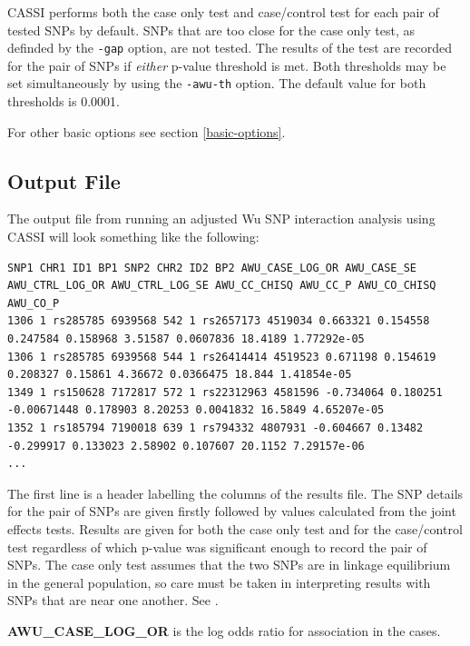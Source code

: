 \documentclass[a4paper,12pt]{article}
\newcommand{\code}[1]{{\footnotesize{{\tt #1}}}}
\begin{document}
CASSI performs both the case only test and case/control test for each pair of tested SNPs by default. SNPs that are too close for the case only test, as definded by the \code{-gap} option, are not tested. The results of the test are recorded for the pair of SNPs if {\it either} p-value threshold is met. Both thresholds may be set simultaneously by using the \code{-awu-th} option. The default value for both thresholds is 0.0001. 

For other basic options see  section \ref{basic-options}. 


\subsection{Output File}
\label{awu-output}

The output file from running an adjusted Wu SNP interaction analysis using CASSI will look something like the following: 
\vspace{0.35cm} \begin{lstlisting}
SNP1 CHR1 ID1 BP1 SNP2 CHR2 ID2 BP2 AWU_CASE_LOG_OR AWU_CASE_SE AWU_CTRL_LOG_OR AWU_CTRL_LOG_SE AWU_CC_CHISQ AWU_CC_P AWU_CO_CHISQ AWU_CO_P
1306 1 rs285785 6939568 542 1 rs2657173 4519034 0.663321 0.154558 0.247584 0.158968 3.51587 0.0607836 18.4189 1.77292e-05
1306 1 rs285785 6939568 544 1 rs26414414 4519523 0.671198 0.154619 0.208327 0.15861 4.36672 0.0366475 18.844 1.41854e-05
1349 1 rs150628 7172817 572 1 rs22312963 4581596 -0.734064 0.180251 -0.00671448 0.178903 8.20253 0.0041832 16.5849 4.65207e-05
1352 1 rs185794 7190018 639 1 rs794332 4807931 -0.604667 0.13482 -0.299917 0.133023 2.58902 0.107607 20.1152 7.29157e-06
...

\end{lstlisting} \vspace{0.35cm}
The first line is a header labelling the columns of the results file. The SNP details for the pair of SNPs are given firstly followed by values calculated from the joint effects tests. Results are given for both the case only test and for the case/control test regardless of which p-value was significant enough to record the pair of SNPs. The case only test assumes that the two SNPs are in linkage equilibrium in the general population, so care must be taken in interpreting results with SNPs that are near one another. See \citet{ueki:etal:12}. 

{\bf AWU\_CASE\_LOG\_OR} is the log odds ratio for association in the cases. 
\end{document}
